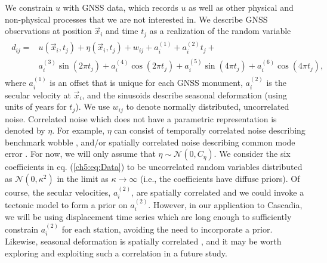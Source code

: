 We constrain $u$ with GNSS data, which records $u$ as well as other physical and non-physical processes that we are not interested in. We describe GNSS observations at position $\vec{x}_i$ and time $t_j$ as a realization of the random variable 
\begin{align}\label{ch5:eq:Data}
\begin{split}
d_{ij} = &u(\vec{x}_i,t_j) + \eta(\vec{x}_i,t_j) + w_{ij} + a^{(1)}_i + a^{(2)}_it_j + \\
         &a^{(3)}_i\sin(2 \pi t_j) + a^{(4)}_i\cos(2 \pi t_j) + a^{(5)}_i\sin(4 \pi t_j) + a^{(6)}_i\cos(4 \pi t_j), 
\end{split}
\end{align}
where $a^{(1)}_{i}$ is an offset that is unique for each GNSS monument, $a^{(2)}_{i}$ is the secular velocity at $\vec{x}_i$, and the sinusoids describe seasonal deformation (using units of years for $t_j$). We use $w_{ij}$ to denote normally distributed, uncorrelated noise. Correlated noise which does not have a parametric representation is denoted by $\eta$.  For example, $\eta$ can consist of temporally correlated noise describing benchmark wobble \citep[e.g.,][]{Wyatt1982,Wyatt1989}, and/or spatially correlated noise describing common mode error \citep[e.g.,][]{Wdowinski1997}. For now, we will only assume that $\eta \sim \mathcal{N}(0,C_\eta)$. We consider the six coefficients in eq. (\ref{ch5:eq:Data}) to be uncorrelated random variables distributed as $\mathcal{N}(0,\kappa^2)$ in the limit as $\kappa \to \infty$ (i.e., the coefficients have diffuse priors). Of course, the secular velocities, $a^{(2)}_{i}$, are spatially correlated and we could invoke a tectonic model to form a prior on $a^{(2)}_{i}$. However, in our application to Cascadia, we will be using displacement time series which are long enough to sufficiently constrain $a^{(2)}_{i}$ for each station, avoiding the need to incorporate a prior. Likewise, seasonal deformation is spatially correlated \citep{Dong2002,Langbein2008}, and it may be worth exploring and exploiting such a correlation in a future study. 

